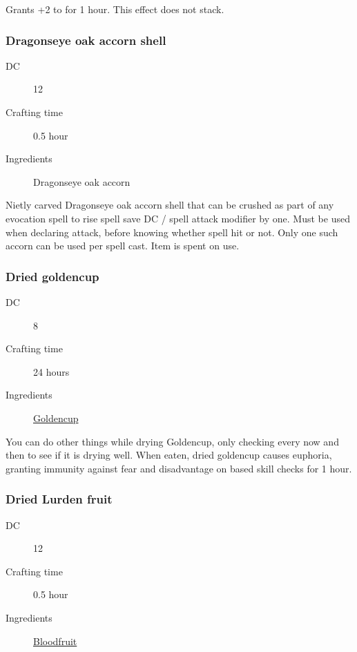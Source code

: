 Grants +2 to \constitution for 1 hour. This effect does not stack.

\subsubsection{Dragonseye oak accorn shell}
\label{Dragonseye oak accorn shell}

\begin{description}
\item [DC] 12 \arcana
\item [Crafting time] 0.5 hour
\item [Ingredients] Dragonseye oak accorn
\end{description}

Nietly carved Dragonseye oak accorn shell that can be crushed as part of any evocation spell to rise spell save DC / spell attack modifier by one. Must be used when declaring attack, before knowing whether spell hit or not. Only one such accorn can be used per spell cast. Item is spent on use.

\subsubsection{Dried goldencup}
\label{Dried goldencup}

\begin{description}
\item [DC] 8 \survival
\item [Crafting time] 24 hours
\item [Ingredients] \hyperref[Goldencup]{Goldencup}
\end{description}

You can do other things while drying Goldencup, only checking every now and then to see if it is drying well.
When eaten, dried goldencup causes euphoria, granting immunity against fear and 
disadvantage on \intelligence{} based skill checks for 1 hour.

\subsubsection{Dried Lurden fruit}
\label{Dried Lurden fruit}

\begin{description}
\item [DC] 12 \arcana
\item [Crafting time] 0.5 hour
\item [Ingredients] \hyperref[Luurden]{Bloodfruit}
\end{description}

